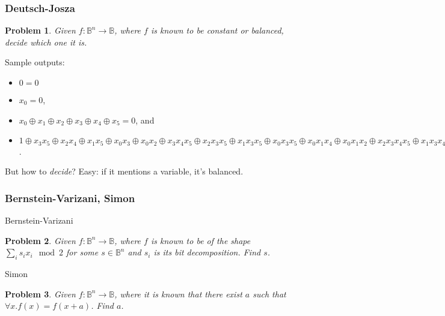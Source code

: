 \documentclass{beamer}
\newcommand{\Bool}{\ensuremath{\mathbb{B}}}
\newtheorem{prob}{Problem}
\begin{document}
\begin{frame}

\frametitle{Deutsch-Josza}

  \begin{prob}Given $f : \Bool^n\rightarrow\Bool$, where $f$ is known to be
\emph{constant} or \emph{balanced}, decide which one it is.
  \end{prob}

\pause

Sample outputs:
\begin{itemize}
\item $0 = 0$
\item $x_0 = 0$,
\item $x_0 \oplus x_1 \oplus x_2 \oplus x_3 \oplus
    x_4 \oplus x_5 = 0$, and
\item $1 \oplus x_3x_5 \oplus x_2x_4 \oplus x_1x_5
\oplus x_0x_3 \oplus x_0x_2 \oplus x_3x_4x_5 \oplus x_2x_3x_5 \oplus
x_1x_3x_5 \oplus x_0x_3x_5 \oplus x_0x_1x_4 \oplus x_0x_1x_2 \oplus
x_2x_3x_4x_5 \oplus x_1x_3x_4x_5 \oplus x_1x_2x_4x_5 \oplus
x_1x_2x_3x_5 \oplus x_0x_3x_4x_5 \oplus x_0x_2x_4x_5 \oplus
x_0x_2x_3x_5 \oplus x_0x_1x_4x_5 \oplus x_0x_1x_3x_5 \oplus
x_0x_1x_3x_4 \oplus x_0x_1x_2x_4 \oplus x_0x_1x_2x_4x_5 \oplus
x_0x_1x_2x_3x_5 \oplus x_0x_1x_2x_3x_4 = 0$.
\end{itemize}

  But how to \emph{decide}? Easy: if it mentions a variable, it's balanced.
\end{frame}


\begin{frame}

\frametitle{Bernstein-Varizani, Simon}

Bernstein-Varizani
\begin{prob}
    Given $f : \Bool^n\rightarrow\Bool$, where $f$ is known to be
of the shape $\sum_i s_i x_i \mod 2$ for some $s\in\Bool^n$ and $s_i$ is its
bit decomposition. Find $s$.
\end{prob}

\pause

Simon
\begin{prob}
    Given $f : \Bool^n\rightarrow\Bool$, where it is known that
    there exist $a$ such that $\forall x. f(x) = f(x + a)$. Find $a$.
\end{prob}

\end{frame}

\end{document}
